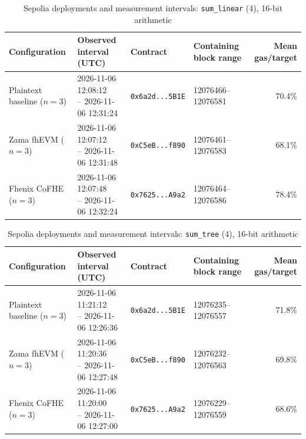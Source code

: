 \begin{table}[!t]
\caption{Sepolia deployments and measurement intervals: \texttt{sum\_linear} (4), 16-bit arithmetic}
\label{tab:sepolia-experiment-deployments-circuits-euint16-circuits-w16-sum-linear-n4}
\centering
\footnotesize
\setlength{\tabcolsep}{4pt}
\begin{tabular}{|l|l|l|l|r|}
\hline
\textbf{Configuration} &
\textbf{Observed interval (UTC)} &
\textbf{Contract} &
\textbf{Containing block range} &
\textbf{Mean gas/target} \\
\hline
Plaintext baseline (\(n=3\)) &
\shortstack[l]{2026-11-06 12:08:12 \\ -- 2026-11-06 12:31:24} &
\texttt{0x6a2d...5B1E} &
12076466--12076581 &
70.4\% \\
\hline
Zama fhEVM (\(n=3\)) &
\shortstack[l]{2026-11-06 12:07:12 \\ -- 2026-11-06 12:31:48} &
\texttt{0xC5eB...f890} &
12076461--12076583 &
68.1\% \\
\hline
Fhenix CoFHE (\(n=3\)) &
\shortstack[l]{2026-11-06 12:07:48 \\ -- 2026-11-06 12:32:24} &
\texttt{0x7625...A9a2} &
12076464--12076586 &
78.4\% \\
\hline
\end{tabular}
\end{table}

\begin{table}[!t]
\caption{Sepolia deployments and measurement intervals: \texttt{sum\_tree} (4), 16-bit arithmetic}
\label{tab:sepolia-experiment-deployments-circuits-euint16-circuits-w16-sum-tree-n4}
\centering
\footnotesize
\setlength{\tabcolsep}{4pt}
\begin{tabular}{|l|l|l|l|r|}
\hline
\textbf{Configuration} &
\textbf{Observed interval (UTC)} &
\textbf{Contract} &
\textbf{Containing block range} &
\textbf{Mean gas/target} \\
\hline
Plaintext baseline (\(n=3\)) &
\shortstack[l]{2026-11-06 11:21:12 \\ -- 2026-11-06 12:26:36} &
\texttt{0x6a2d...5B1E} &
12076235--12076557 &
71.8\% \\
\hline
Zama fhEVM (\(n=3\)) &
\shortstack[l]{2026-11-06 11:20:36 \\ -- 2026-11-06 12:27:48} &
\texttt{0xC5eB...f890} &
12076232--12076563 &
69.8\% \\
\hline
Fhenix CoFHE (\(n=3\)) &
\shortstack[l]{2026-11-06 11:20:00 \\ -- 2026-11-06 12:27:00} &
\texttt{0x7625...A9a2} &
12076229--12076559 &
68.6\% \\
\hline
\end{tabular}
\end{table}

